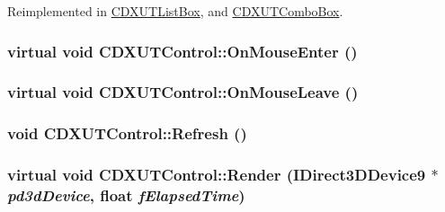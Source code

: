 Reimplemented in \hyperlink{class_c_d_x_u_t_list_box_af999f44d44f4b6aa1f434d95317119af}{CDXUTListBox}, and \hyperlink{class_c_d_x_u_t_combo_box_a57760cc904757ae273c297245743f3af}{CDXUTComboBox}.\hypertarget{class_c_d_x_u_t_control_a0bb610c517415f885989136bd7797229}{
\subsubsection[{OnMouseEnter}]{\setlength{\rightskip}{0pt plus 5cm}virtual void CDXUTControl::OnMouseEnter ()}}
\label{class_c_d_x_u_t_control_a0bb610c517415f885989136bd7797229}
\hypertarget{class_c_d_x_u_t_control_ad641d612cbdeb58ab6fcadff807206d1}{
\subsubsection[{OnMouseLeave}]{\setlength{\rightskip}{0pt plus 5cm}virtual void CDXUTControl::OnMouseLeave ()}}
\label{class_c_d_x_u_t_control_ad641d612cbdeb58ab6fcadff807206d1}
\hypertarget{class_c_d_x_u_t_control_a6d81df6b2d6739e44b4b4aee9ab156b1}{
\subsubsection[{Refresh}]{\setlength{\rightskip}{0pt plus 5cm}void CDXUTControl::Refresh ()}}
\label{class_c_d_x_u_t_control_a6d81df6b2d6739e44b4b4aee9ab156b1}
\hypertarget{class_c_d_x_u_t_control_afd92fa04241f66fdbf207bc5870c9388}{
\subsubsection[{Render}]{\setlength{\rightskip}{0pt plus 5cm}virtual void CDXUTControl::Render (IDirect3DDevice9 $\ast$ {\em pd3dDevice}, \/  float {\em fElapsedTime})}}
\label{class_c_d_x_u_t_control_afd92fa04241f66fdbf207bc5870c9388}


